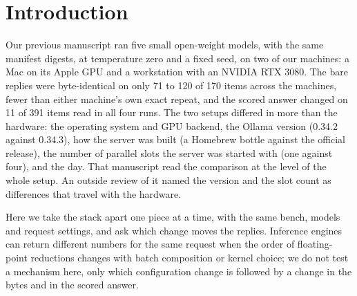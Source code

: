 \section{Introduction}
Our previous manuscript \citep{pub2} ran five small open-weight models, with the same manifest digests, at temperature zero and a fixed
seed, on two of our machines: a Mac on its Apple GPU and a workstation with an NVIDIA RTX 3080. The bare replies were byte-identical on
only 71 to 120 of 170 items across the machines, fewer than either machine's own exact repeat, and the scored answer changed on 11 of 391
items read in all four runs. The two setups differed in more than the hardware: the operating system and GPU backend, the Ollama version
(0.34.2 against 0.34.3), how the server was built (a Homebrew bottle against the official release), the number of parallel slots the
server was started with (one against four), and the day. That manuscript read the comparison at the level of the whole setup. An outside
review of it named the version and the slot count as differences that travel with the hardware.

Here we take the stack apart one piece at a time, with the same bench, models and request settings, and ask which change moves the
replies. Inference engines can return different numbers for the same request when the order of floating-point reductions changes with
batch composition or kernel choice; we do not test a mechanism here, only which configuration change is followed by a change in the bytes
and in the scored answer.
